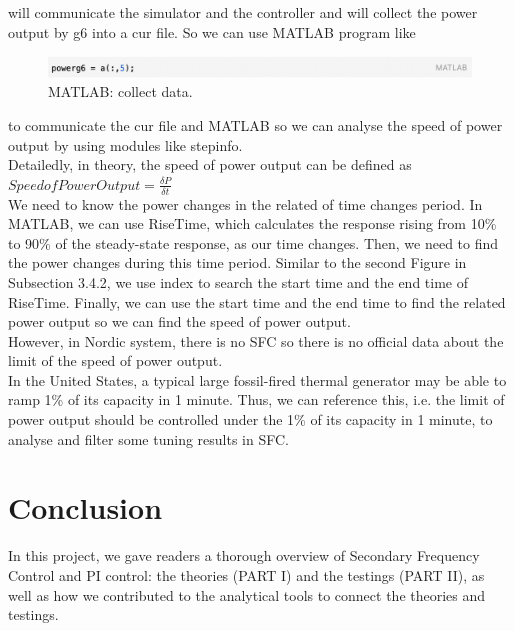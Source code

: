 \documentclass{report}
\begin{document}
will communicate the simulator and the controller and will collect the power output by g6 into a cur file. So we can use MATLAB program like\\

\begin{figure}[htbp]
\centering
\includegraphics[width = .819\textwidth]{figure/6_5_code2.png}
\caption{MATLAB: collect data.}
\label{6_5_code2}
\end{figure}

to communicate the cur file and MATLAB so we can analyse the speed of power output by using modules like stepinfo.\\

Detailedly, in theory, the speed of power output can be defined as\\

$Speed of Power Output = \frac{\delta P}{\delta t}$\\

We need to know the power changes in the related of time changes period. In MATLAB, we can use RiseTime, which calculates the response rising from 10\% to 90\% of the steady-state response, as our time changes. Then, we need to find the power changes during this time period. Similar to the second Figure in Subsection 3.4.2, we use index to search the start time and the end time of RiseTime. Finally,  we can use the start time and the end time to find the related power output so we can find the speed of power output.\\


However, in Nordic system, there is no SFC so there is no official data about the limit of the speed of power output. \\

In the United States, a typical large fossil-fired thermal generator may be able to ramp 1\% of its capacity in 1 minute. Thus, we can reference this, i.e. the limit of power output should be controlled under the 1\% of its capacity in 1 minute, to analyse and filter some tuning results in SFC.\\


\chapter{Conclusion}
\label{Chapter7}
In this project, we gave readers a thorough overview of Secondary Frequency Control and PI control: the theories (PART I) and the testings (PART II), as well as how we contributed to the analytical tools to connect the theories and testings.\\
\end{document}
